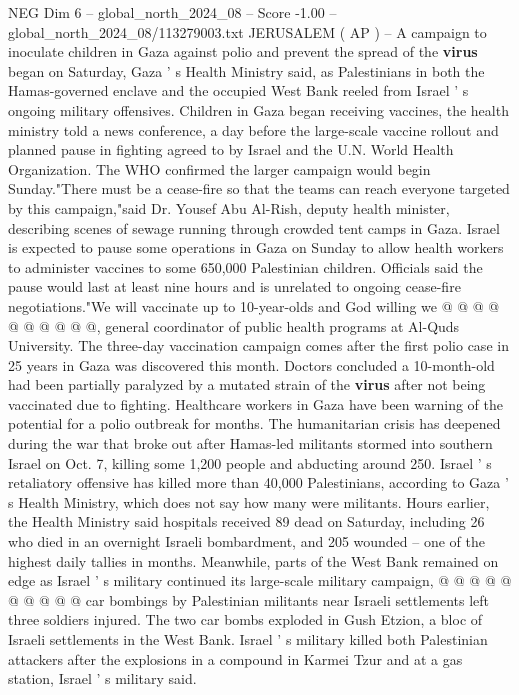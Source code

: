 \begin{textsample}{NEG Dim 6 – global\_north\_2024\_08 – Score -1.00 – global\_north\_2024\_08/113279003.txt}  \label{ex:f6_neg_075}
JERUSALEM ( AP ) -- A campaign to inoculate children in Gaza against polio and prevent the spread of the \textbf{virus} began on Saturday, Gaza ' s Health Ministry said, as Palestinians in both the Hamas-governed enclave and the occupied West Bank reeled from Israel ' s ongoing military offensives.
Children in Gaza began receiving vaccines, the health ministry told a news conference, a day before the large-scale vaccine rollout and planned pause in fighting agreed to by Israel and the U.N.
World Health Organization.
The WHO confirmed the larger campaign would begin Sunday."There must be a cease-fire so that the teams can reach everyone targeted by this campaign,"said Dr.
Yousef Abu Al-Rish, deputy health minister, describing scenes of sewage running through crowded tent camps in Gaza.
Israel is expected to pause some operations in Gaza on Sunday to allow health workers to administer vaccines to some 650,000 Palestinian children.
Officials said the pause would last at least nine hours and is unrelated to ongoing cease-fire negotiations."We will vaccinate up to 10-year-olds and God willing we @ @ @ @ @ @ @ @ @ @, general coordinator of public health programs at Al-Quds University.
The three-day vaccination campaign comes after the first polio case in 25 years in Gaza was discovered this month.
Doctors concluded a 10-month-old had been partially paralyzed by a mutated strain of the \textbf{virus} after not being vaccinated due to fighting.
Healthcare workers in Gaza have been warning of the potential for a polio outbreak for months.
The humanitarian crisis has deepened during the war that broke out after Hamas-led militants stormed into southern Israel on Oct. 7, killing some 1,200 people and abducting around 250.
Israel ' s retaliatory offensive has killed more than 40,000 Palestinians, according to Gaza ' s Health Ministry, which does not say how many were militants.
Hours earlier, the Health Ministry said hospitals received 89 dead on Saturday, including 26 who died in an overnight Israeli bombardment, and 205 wounded -- one of the highest daily tallies in months.
Meanwhile, parts of the West Bank remained on edge as Israel ' s military continued its large-scale military campaign, @ @ @ @ @ @ @ @ @ @ car bombings by Palestinian militants near Israeli settlements left three soldiers injured.
The two car bombs exploded in Gush Etzion, a bloc of Israeli settlements in the West Bank.
Israel ' s military killed both Palestinian attackers after the explosions in a compound in Karmei Tzur and at a gas station, Israel ' s military said.

\end{textsample}
